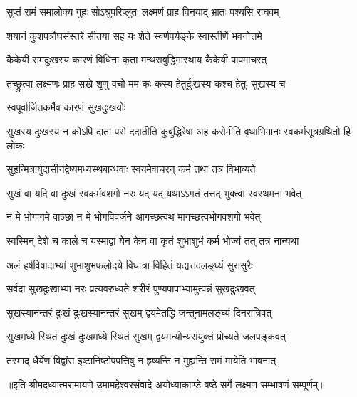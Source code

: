 

\twolineshloka
{सुप्तं रामं समालोक्य गुहः सोऽश्रुपरिप्लुतः}
{लक्ष्मणं प्राह विनयाद् भ्रातः पश्यसि राघवम्} %

\twolineshloka
{शयानं कुशपत्रौघसंस्तरे सीतया सह}
{यः शेते स्वर्णपर्यङ्के स्वास्तीर्णे भवनोत्तमे} %

\twolineshloka
{कैकेयी रामदुःखस्य कारणं विधिना कृता}
{मन्थराबुद्धिमास्थाय कैकेयी पापमाचरत्} %

\twolineshloka
{तच्छ्रुत्वा लक्ष्मणः प्राह सखे शृणु वचो मम}
{कः कस्य हेतुर्दुःखस्य कश्च हेतुः सुखस्य च} %

\onelineshloka
{स्वपूर्वार्जितकर्मैव कारणं सुखदुःखयोः} %

\fourlineindentedshloka
{सुखस्य दुःखस्य न कोऽपि दाता}
{परो ददातीति कुबुद्धिरेषा}
{अहं करोमीति वृथाभिमानः}
{स्वकर्मसूत्रग्रथितो हि लोकः} %

\twolineshloka
{सुहृन्मित्रार्युदासीनद्वेष्यमध्यस्थबान्धवाः}
{स्वयमेवाचरन् कर्म तथा तत्र विभाव्यते} %

\twolineshloka
{सुखं वा यदि वा दुःखं स्वकर्मवशगो नरः}
{यद् यद् यथाऽऽगतं तत्तद् भुक्त्वा स्वस्थमना भवेत्} %

\twolineshloka
{न मे भोगागमे वाञ्छा न मे भोगविवर्जने}
{आगच्छत्वथ मागच्छत्वभोगवशगो भवेत्} %

\twolineshloka
{स्वस्मिन् देशे च काले च यस्माद्वा येन केन वा}
{कृतं शुभाशुभं कर्म भोज्यं तत् तत्र नान्यथा} %

\twolineshloka
{अलं हर्षविषादाभ्यां शुभाशुभफलोदये}
{विधात्रा विहितं यद्यत्तदलङ्घ्यं सुरासुरैः} %

\twolineshloka
{सर्वदा सुखदुःखाभ्यां नरः प्रत्यवरुध्यते}
{शरीरं पुण्यपापाभ्यामुत्पन्नं सुखदुःखवत्} %

\twolineshloka
{सुखस्यानन्तरं दुःखं दुःखस्यानन्तरं सुखम्}
{द्वयमेतद्धि जन्तूनामलङ्घ्यं दिनरात्रिवत्} %

\twolineshloka
{सुखमध्ये स्थितं दुःखं दुःखमध्ये स्थितं सुखम्}
{द्वयमन्योन्यसंयुक्तं प्रोच्यते जलपङ्कवत्} %

\twolineshloka
{तस्माद् धैर्येण विद्वांस इष्टानिष्टोपपत्तिषु}
{न हृष्यन्ति न मुह्यन्ति समं मायेति भावनात्} %

{॥इति श्रीमदध्यात्मरामायणे उमामहेश्वरसंवादे
अयोध्याकाण्डे षष्ठे सर्गे  लक्ष्मण-सम्भाषणं  सम्पूर्णम्॥}
